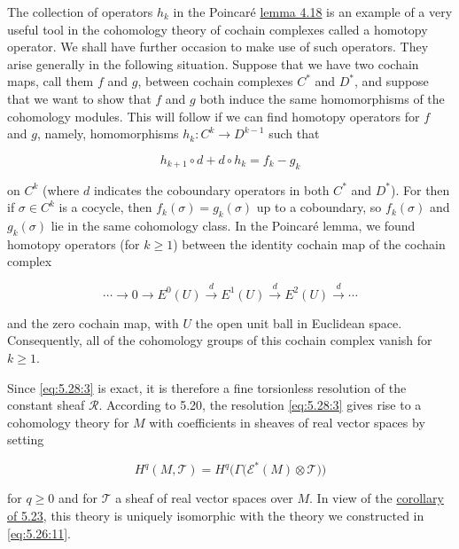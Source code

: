 \begin{remarks}\label{thm:5.29}
The collection of operators $h_k$ in the Poincaré \hyperref[thm:4.18]{lemma 4.18} is an example of a very useful tool in the cohomology theory of cochain complexes called a homotopy operator. We shall have further occasion to make use of such operators. They arise generally in the following situation. Suppose that we have two cochain maps, call them $f$ and $g$, between cochain complexes $C^*$ and $D^*$, and suppose that we want to show that $f$ and $g$ both induce the same homomorphisms of the cohomology modules. This will follow if we can find homotopy operators for $f$ and $g$, namely, homomorphisms $h_k: C^k \to D^{k-1}$ such that

\[
h_{k+1}\circ d+d\circ h_{k}=f_{k}-g_{k}
\]

on $C^k$ (where $d$ indicates the coboundary operators in both $C^*$ and $D^*$). For then if $\sigma \in C^k$ is a cocycle, then $f_k(\sigma) = g_k(\sigma)$ up to a coboundary, so $f_k(\sigma)$ and $g_k(\sigma)$ lie in the same cohomology class. In the Poincaré lemma, we found homotopy operators (for $k \geq 1$) between the identity cochain map of the cochain complex

\[
\cdots\to0\to E^{0}(U)\xrightarrow{d}E^{1}(U)\xrightarrow{d}E^{2}(U)\xrightarrow{d}\cdots
\]

and the zero cochain map, with $U$ the open unit ball in Euclidean space. Consequently, all of the cohomology groups of this cochain complex vanish for $k \geq 1$.

\end{remarks}

\label{thm:5.30} Since \eqref{eq:5.28:3} is exact, it is therefore a fine torsionless resolution of the constant sheaf $\mathcal{R}$. According to 5.20, the resolution \eqref{eq:5.28:3} gives rise to a cohomology theory for $M$ with coefficients in sheaves of real vector spaces by setting

\begin{equation}
\tag{1}\label{eq:5.30:1}
H^{q}(M,\mathcal{T})=H^{q}\big(\Gamma\big(\mathcal{E}^{*}(M)\otimes\mathcal{T}\big)\big)
\end{equation}

for $q \geq 0$ and for $\mathcal{T}$ a sheaf of real vector spaces over $M$. In view of the \hyperref[thm:5.23]{corollary of 5.23}, this theory is uniquely isomorphic with the theory we constructed in \eqref{eq:5.26:11}.

